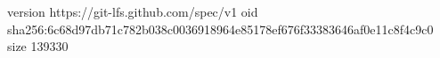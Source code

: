 version https://git-lfs.github.com/spec/v1
oid sha256:6c68d97db71c782b038c0036918964e85178ef676f33383646af0e11c8f4c9c0
size 139330

